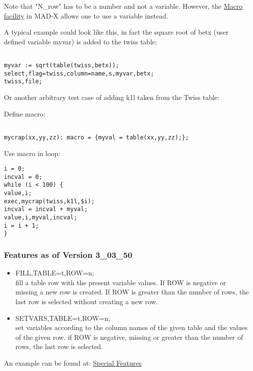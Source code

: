 Note that "N\_row" has to be a number and not a  variable. However, the
\href{../control/special.html#macro}{Macro facility} in MAD-X  allows
one to use a variable instead.   

A typical example could look like this, in fact the square root of betx
(user defined variable myvar) is added to the twiss table:  


\begin{verbatim}

myvar := sqrt(table(twiss,betx));
select,flag=twiss,column=name,s,myvar,betx;
twiss,file;
\end{verbatim}

Or another arbitrary test case of adding k1l taken from the Twiss table: 


Define macro: 
\begin{verbatim}

mycrap(xx,yy,zz): macro = {myval = table(xx,yy,zz);};
\end{verbatim}

Use macro in loop: 
\begin{verbatim}
i = 0;
incval = 0;
while (i < 100) {
value,i;
exec,mycrap(twiss,k1l,$i);
incval = incval + myval;
value,i,myval,incval;                
i = i + 1;
}
\end{verbatim}

\subsubsection{Features as of Version 3\_03\_50}

\begin{itemize}
  \item  FILL,TABLE=t,ROW=n; \\
    fill a table row with the present variable values. If ROW is
    negative or missing a new row is created. If ROW is greater than the
    number of rows, the last row is selected without creating a new row.  

  \item SETVARS,TABLE=t,ROW=n; \\
    set variables according to the column names of the given table and
    the values of the given row. if ROW is negative, missing or greater
    than the number of rows, the last row is selected. 
\end{itemize}


An example can be found at:
\href{http://cern.ch/frs/mad-X_examples/special_features}{Special
  Features} 

